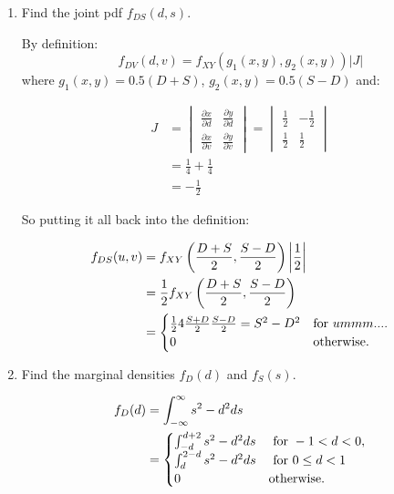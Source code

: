 \documentclass{article}
\newcommand{\1}{\mathbf{1}}
\begin{document}
\begin{enumerate}
    \newpage
    \item Find the joint pdf $f_{DS}(d,s)$.
    
    By definition:
    $$f_{DV}(d,v) = f_{XY}(g_1(x,y), g_2(x,y)) |J|$$
    where $g_1(x,y)=0.5(D+S)$, $g_2(x,y)=0.5(S-D)$ and:
    
    \begin{align*}
    J &= \begin{vmatrix}
        \frac{\partial x}{\partial d} & \frac{\partial y}{\partial d} \\ 
        \frac{\partial x}{\partial v} & \frac{\partial y}{\partial v}
        \end{vmatrix} 
     = \begin{vmatrix}
        \frac{1}{2} & -\frac{1}{2} \\ 
        \frac{1}{2} & \frac{1}{2}
        \end{vmatrix} \\
    &= \frac{1}{4} + \frac{1}{4} \\
    &= - \frac{1}{2}
    \end{align*}
    
    So putting it all back into the definition:
    
    \begin{align*}
     f_{DS}(u,v) &= f_{XY}\left(\frac{D + S}{2}, \frac{S - D}{2}\right) \bigg|\frac{1}{2}\bigg| \\
     &= \frac{1}{2} f_{XY}\left(\frac{D + S}{2}, \frac{S - D}{2}\right) \\
     &= \begin{cases}
        \frac{1}{2} 4\frac{S+D}{2}\frac{S-D}{2} = S^2-D^2 & \hbox{for } ummm....\\ 
        0 & \hbox{otherwise.}
        \end{cases}
    \end{align*}

    \newpage
    \item Find the marginal densities $f_D(d)$ and $f_S(s)$.
    
    \begin{align*}
    f_{D}(d) &= \int_{-\infty}^\infty s^2 - d^2 ds \\
    &= \begin{cases}
       \int_{-d}^{d+2} s^2 - d^2 ds &\hbox{ for } -1 < d < 0, \\
       \int_{d}^{2-d} s^2 - d^2 ds  &\hbox{ for } 0\leq d < 1 \\
       0 &\hbox{otherwise.}
       \end{cases}
    \end{align*}
    

\end{enumerate}
\end{document}
